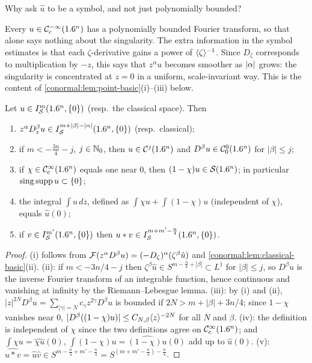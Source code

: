 \begin{question}
  Why ask $\hat u$ to be a symbol, and not just polynomially bounded?
\end{question}
\begin{answer}
  Every $u\in\mathcal{C}^{-\infty}_{\mathrm{c}}(1.6^n)$ has a polynomially bounded Fourier transform, so that
  alone says nothing about the singularity. The extra information in the
  symbol estimates is that each $\zeta$-derivative gains a power of
  $\langle \zeta\rangle^{-1}$. Since $D_\zeta$ corresponds to multiplication by $-z$, this
  says that $z^\alpha u$ becomes smoother as $\lvert \alpha\rvert$ grows: the singularity
  is concentrated at $z=0$ in a uniform, scale-invariant way. This is the
  content of \cref{conormal:lem:point-basic}(i)--(iii) below.
\end{answer}

\begin{lemma}\label{conormal:lem:point-basic}
  Let $u\in I^{m}_{\mathcal{S}}(1.6^n,\{0\})$ (resp.\ the classical space).  Then
  \begin{enumerate}[label=(\roman*)]
  \item $z^\alpha D_z^\beta u\in I^{m+|\beta|-|\alpha|}_{\mathcal{S}}(1.6^n,\{0\})$ (resp.\
    classical);
  \item if $m<-\frac{3n}4-j$, $j\in\mathbb{N}_0$, then $u\in\mathcal C^j(1.6^n)$ and
    $D^\beta u\in\mathcal{C}^0_0(1.6^n)$ for $|\beta|\le j$;
  \item if $\chi\in\mathcal{C}^\infty_{\mathrm{c}}(1.6^n)$ equals one near $0$, then $(1-\chi)u\in\mathcal{S}(1.6^n)$;
    in particular $\operatorname{sing\,supp} u\subset\{0\}$;
  \item the integral $\int u\,dz$, defined as $\int\chi u+\int(1-\chi)u$
    (independent of $\chi$), equals $\hat u(0)$;
  \item if $v\in I^{m'}_{\mathcal{S}}(1.6^n,\{0\})$ then $u*v\in
    I^{m+m'-\frac n4}_{\mathcal{S}}(1.6^n,\{0\})$.
  \end{enumerate}
\end{lemma}
\begin{proof}
  (i) follows from $\mathcal{F}(z^\alpha D^\beta u)=(-D_\zeta)^\alpha(\zeta^\beta\hat
  u)$ and \cref{conormal:lem:classical-basic}(ii).  (ii): if $m<-3n/4-j$ then
  $\zeta^\beta\hat u\in S^{m-\frac n4+|\beta|}\subset L^1$ for $|\beta|\le j$,
  so $D^\beta u$ is the inverse Fourier transform of an integrable function,
  hence continuous and vanishing at infinity by the Riemann--Lebesgue lemma.
  (iii): by (i) and (ii), $|z|^{2N}D^\beta u=\sum_{|\gamma|=N}c_\gamma
  z^{2\gamma}D^\beta u$ is bounded if $2N>m+|\beta|+3n/4$; since $1-\chi$ vanishes
  near $0$, $|D^\beta((1-\chi)u)|\le C_{N,\beta}\langle z\rangle^{-2N}$ for all $N$ and
  $\beta$.  (iv): the definition is independent of $\chi$ since the two
  definitions agree on $\mathcal{C}^\infty_{\mathrm{c}}(1.6^n)$; and $\int\chi u=\widehat{\chi u}(0)$,
  $\int(1-\chi)u=\widehat{(1-\chi)u}(0)$ add up to $\hat u(0)$.  (v): $\widehat{u*v}=
  \hat u\hat v\in S^{m-\frac n4+m'-\frac n4}=S^{(m+m'-\frac n4)-\frac n4}$.
\end{proof}

